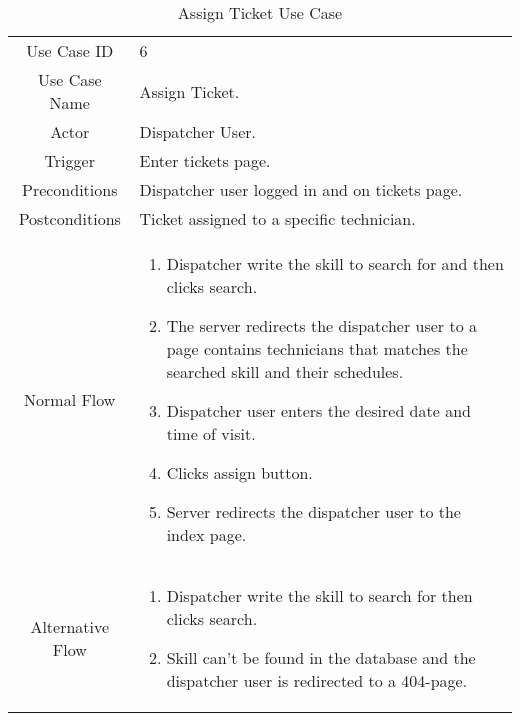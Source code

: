 	\begin{table}[H]
		\centering
		\renewcommand{\arraystretch}{1.5}
		\begin{tabular}[t]{ c  m{10cm} }
			Use Case ID & 6  \\
			Use Case Name & Assign Ticket. \\
			Actor & Dispatcher User. \\
			Trigger & Enter tickets page. \\
			Preconditions & Dispatcher user logged in and on tickets page. \\
			Postconditions & Ticket assigned to a specific technician. \\
			Normal Flow &\begin{enumerate}
				\item Dispatcher write the skill to search for and then clicks search.
				\item The server redirects the dispatcher user to a page contains technicians that matches the searched skill and their schedules.
				\item Dispatcher user enters the desired date and time of visit.
				\item Clicks assign button.
				\item Server redirects the dispatcher user to the index page.
			\end{enumerate}\\
			Alternative Flow &\begin{enumerate}
			\item Dispatcher write the skill to search for then clicks search.
			\item Skill can't be found in the database and the dispatcher user is redirected to a 404-page.
			\end{enumerate} \\
		\end{tabular}
		\caption{Assign Ticket Use Case}
		\renewcommand{\arraystretch}{1.0}
	\end{table}